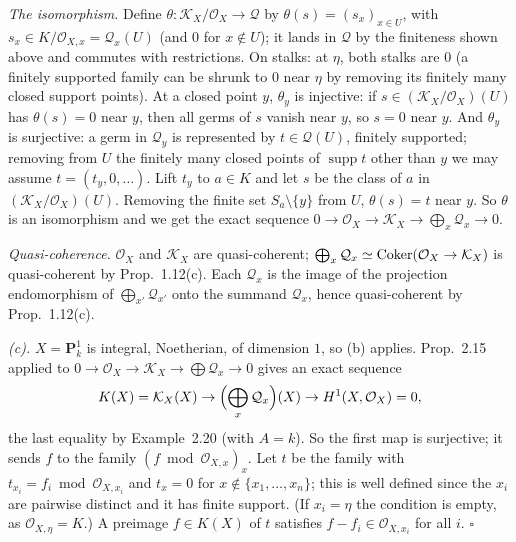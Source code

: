 \documentclass[11pt]{article}
\begin{document}
\emph{The isomorphism.} Define $\theta:\mathcal K_X/\mathcal O_X\to\mathcal Q$ by $\theta(s)=(s_x)_{x\in U}$, with $s_x\in K/\mathcal O_{X,x}=\mathcal Q_x(U)$ (and $0$ for $x\notin U$); it lands in $\mathcal Q$ by the finiteness shown above and commutes with restrictions. On stalks: at $\eta$, both stalks are $0$ (a finitely supported family can be shrunk to $0$ near $\eta$ by removing its finitely many closed support points). At a closed point $y$, $\theta_y$ is injective: if $s\in(\mathcal K_X/\mathcal O_X)(U)$ has $\theta(s)=0$ near $y$, then all germs of $s$ vanish near $y$, so $s=0$ near $y$. And $\theta_y$ is surjective: a germ in $\mathcal Q_y$ is represented by $t\in\mathcal Q(U)$, finitely supported; removing from $U$ the finitely many closed points of $\operatorname{supp}t$ other than $y$ we may assume $t=(t_y,0,\dots)$. Lift $t_y$ to $a\in K$ and let $s$ be the class of $a$ in $(\mathcal K_X/\mathcal O_X)(U)$. Removing the finite set $S_a\setminus\{y\}$ from $U$, $\theta(s)=t$ near $y$. So $\theta$ is an isomorphism and we get the exact sequence $0\to\mathcal O_X\to\mathcal K_X\to\bigoplus_x\mathcal Q_x\to0$.

\emph{Quasi-coherence.} $\mathcal O_X$ and $\mathcal K_X$ are quasi-coherent; $\bigoplus_x\mathcal Q_x\simeq\operatorname{Coker}(\mathcal O_X\to\mathcal K_X)$ is quasi-coherent by Prop.~1.12(c). Each $\mathcal Q_x$ is the image of the projection endomorphism of $\bigoplus_{x'}\mathcal Q_{x'}$ onto the summand $\mathcal Q_x$, hence quasi-coherent by Prop.~1.12(c).

\emph{(c).} $X=\mathbf P^1_k$ is integral, Noetherian, of dimension $1$, so (b) applies. Prop.~2.15 applied to $0\to\mathcal O_X\to\mathcal K_X\to\bigoplus\mathcal Q_x\to0$ gives an exact sequence
\[ K(X)=\mathcal K_X(X)\to\Bigl(\bigoplus_x\mathcal Q_x\Bigr)(X)\to H^1(X,\mathcal O_X)=0, \]
the last equality by Example~2.20 (with $A=k$). So the first map is surjective; it sends $f$ to the family $(f\bmod\mathcal O_{X,x})_x$. Let $t$ be the family with $t_{x_i}=f_i\bmod\mathcal O_{X,x_i}$ and $t_x=0$ for $x\notin\{x_1,\dots,x_n\}$; this is well defined since the $x_i$ are pairwise distinct and it has finite support. (If $x_i=\eta$ the condition is empty, as $\mathcal O_{X,\eta}=K$.) A preimage $f\in K(X)$ of $t$ satisfies $f-f_i\in\mathcal O_{X,x_i}$ for all $i$. \hfill$\square$
\end{document}
